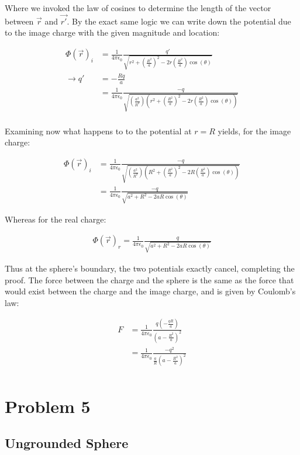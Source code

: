 \documentclass[paper=a4, fontsize=11pt]{scrartcl} %
\newcommand{\kay}{\frac{1}{4 \pi \epsilon_0}}
\numberwithin{equation}{section} %
\numberwithin{figure}{section} %
\numberwithin{table}{section} %
\begin{document}
Where we invoked the law of cosines to determine the length of the vector between $\vec{r}$ and $\vec{r'}$. By the exact same logic we can write down the potential due to the image charge with the given magnitude and location:

\begin{align}
\Phi(\vec{r})_i &= \kay \frac{q'}{\sqrt{r^2 + \left(\frac{R^2}{a}\right)^2 - 2 r \left(\frac{R^2}{a}\right)\cos(\theta)}} \\ 
\rightarrow q' &= -\frac{R q}{a} \\
&= \kay \frac{-q}{\sqrt{\left(\frac{a^2}{R^2}\right)\left(r^2 + \left(\frac{R^2}{a}\right)^2 - 2 r \left(\frac{R^2}{a}\right)\cos(\theta)\right)}} \\
\end{align}

Examining now what happens to to the potential at $r=R$ yields, for the image charge:

\begin{align}
\Phi(\vec{r})_i &= \kay \frac{-q}{\sqrt{\left(\frac{a^2}{R^2}\right)\left(R^2 + \left(\frac{R^2}{a}\right)^2 - 2 R \left(\frac{R^2}{a}\right)\cos(\theta)\right)}} \\
&= \kay \frac{-q}{\sqrt{a^2 + R^2 - 2 a R \cos(\theta)}}
\end{align} 

Whereas for the real charge:

\begin{align}
\Phi(\vec{r})_r = \kay \frac{q}{\sqrt{a^2 + R^2 - 2 a R \cos(\theta)}}
\end{align}

Thus at the sphere's boundary, the two potentials exactly cancel, completing the proof. The force between the charge and the sphere is the same as the force that would exist between the charge and the image charge, and is given by Coulomb's law:

\begin{align}
F &= \kay \frac{q \left(-\frac{qR}{a}\right)}{(a - \frac{R^2}{a})^2} \\
&= \kay \frac{-q^2}{\frac{a}{R}\left(a - \frac{R^2}{a}\right)^2} \\
\end{align}

\section{Problem 5}

\subsection{Ungrounded Sphere}
\end{document}
